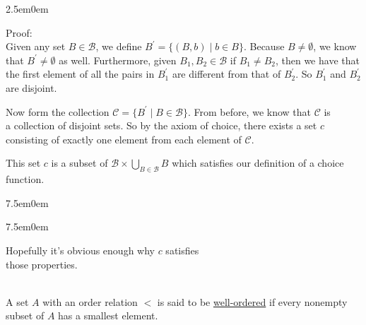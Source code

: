 \documentclass{book}
\newcommand{\hTwo}{%
\color{Black}%
   \fontsize{13}{15}\selectfont%
}
\newcommand{\myComment}{%
   \color{RawerSienna}%
   \fontsize{12}{14}\selectfont%
}
\newenvironment{myIndent}{%
   \begin{adjustwidth}{2.5em}{0em}%
}{%
   \end{adjustwidth}%
}
\newenvironment{myTindent}{%
   \begin{adjustwidth}{7.5em}{0em}%
}{%
   \end{adjustwidth}%
}
\newcommand{\udefine}[1]{{%
   \setulcolor{Red}%
   \setul{0.14em}{0.07em}%
   \ul{#1}%
}}
\newcommand{\mySepTwo}[1][.]{%
   {\noindent\color{#1}{\rule{6.5in}{0.5mm}}}\\%
}
\newcommand{\retTwo}{\hfill\bigbreak}
\begin{document}
   
   \begin{myIndent}\hTwo
      Proof:\\
      Given any set $B \in \mathcal{B}$, we define $B^\prime = \{(B, b) \mid b \in B\}$. Because $B \neq \emptyset$, we know that $B^\prime \neq \emptyset$ as well. Furthermore, given $B_1, B_2 \in \mathcal{B}$ if $B_1 \neq B_2$, then we have that the first element of all the pairs in $B_1^\prime$ are different from that of $B_2^\prime$. So $B_1^\prime$ and $B_2^\prime$ are disjoint.\retTwo

      Now form the collection $\mathcal{C} = \{B^\prime \mid B \in \mathcal{B}\}$. From before, we know that $\mathcal{C}$ is\\ a collection of disjoint sets. So by the axiom of choice, there exists a set $c$\\ consisting of exactly one element from each element of $\mathcal{C}$.\retTwo

      This set $c$ is a subset of $\mathcal{B} \times \bigcup\limits_{B \in \mathcal{B}}B$ which satisfies our definition of a choice function.\\ [-12pt]
      \begin{myTindent}\begin{myTindent}\myComment
         Hopefully it's obvious enough why $c$ satisfies\\ those properties.\retTwo\retTwo
      \end{myTindent}\end{myTindent}
   \end{myIndent}

   \mySepTwo

   A set $A$ with an order relation $<$ is said to be \udefine{well-ordered} if every nonempty subset of $A$ has a smallest element.\retTwo
\end{document}
